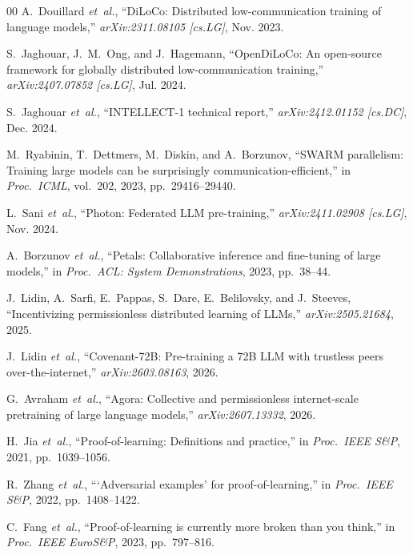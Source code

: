 \documentclass[conference]{IEEEtran}
\begin{document}

\begin{thebibliography}{00}
A.~Douillard \emph{et~al.}, ``DiLoCo: Distributed low-communication training of language models,'' \emph{arXiv:2311.08105 [cs.LG]}, Nov. 2023.

S.~Jaghouar, J.~M.~Ong, and J.~Hagemann, ``OpenDiLoCo: An open-source framework for globally distributed low-communication training,'' \emph{arXiv:2407.07852 [cs.LG]}, Jul. 2024.

S.~Jaghouar \emph{et~al.}, ``INTELLECT-1 technical report,'' \emph{arXiv:2412.01152 [cs.DC]}, Dec. 2024.

M.~Ryabinin, T.~Dettmers, M.~Diskin, and A.~Borzunov, ``SWARM parallelism: Training large models can be surprisingly communication-efficient,'' in \emph{Proc.\ ICML}, vol.~202, 2023, pp.~29416--29440.

L.~Sani \emph{et~al.}, ``Photon: Federated LLM pre-training,'' \emph{arXiv:2411.02908 [cs.LG]}, Nov. 2024.

A.~Borzunov \emph{et~al.}, ``Petals: Collaborative inference and fine-tuning of large models,'' in \emph{Proc.\ ACL: System Demonstrations}, 2023, pp.~38--44.

J.~Lidin, A.~Sarfi, E.~Pappas, S.~Dare, E.~Belilovsky, and J.~Steeves, ``Incentivizing permissionless distributed learning of LLMs,'' \emph{arXiv:2505.21684}, 2025.

J.~Lidin \emph{et~al.}, ``Covenant-72B: Pre-training a 72B LLM with trustless peers over-the-internet,'' \emph{arXiv:2603.08163}, 2026.

G.~Avraham \emph{et~al.}, ``Agora: Collective and permissionless internet-scale pretraining of large language models,'' \emph{arXiv:2607.13332}, 2026.

H.~Jia \emph{et~al.}, ``Proof-of-learning: Definitions and practice,'' in \emph{Proc.\ IEEE S\&P}, 2021, pp.~1039--1056.

R.~Zhang \emph{et~al.}, ```Adversarial examples' for proof-of-learning,'' in \emph{Proc.\ IEEE S\&P}, 2022, pp.~1408--1422.

C.~Fang \emph{et~al.}, ``Proof-of-learning is currently more broken than you think,'' in \emph{Proc.\ IEEE EuroS\&P}, 2023, pp.~797--816.


\end{thebibliography}
\end{document}
